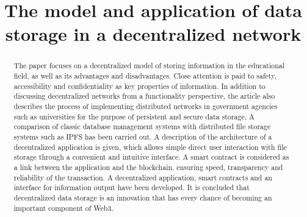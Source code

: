 \documentclass[10pt,conference,a4paper]{IEEEtran_EDM}
\def\confheader{}
\begin{document}
\markboth{\confheader}{}
\title{The model and application of data storage in a decentralized network}

\author{
\and
{}
\and
{}
\and
}

\maketitle


\begin{abstract}
The paper focuses on a decentralized model of storing information in the educational field, as well as its advantages and disadvantages.
Close attention is paid to safety, accessibility and confidentiality as key properties of information.
In addition to discussing decentralized networks from a functionality perspective, the article also describes the process of implementing distributed networks in government agencies such as universities for the purpose of persistent and secure data storage.
A comparison of classic database management systems with distributed file storage systems such as IPFS has been carried out.
A description of the architecture of a decentralized application is given, which allows simple direct user interaction with file storage through a convenient and intuitive interface.
A smart contract is considered as a link between the application and the blockchain, ensuring speed, transparency and reliability of the transaction.
A decentralized application, smart contracts and an interface for information output have been developed.
It is concluded that decentralized data storage is an innovation that has every chance of becoming an important component of Web3.

\end{abstract}
\end{document}
